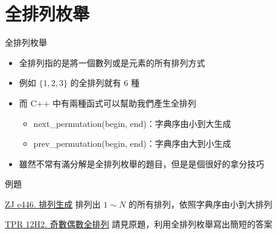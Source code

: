 \documentclass[aspectratio=169]{beamer}
\begin{document}
    \section{全排列枚舉}

    \begin{frame}{全排列枚舉}
        \begin{itemize}
            \item<1-> 全排列指的是將一個數列或是元素的所有排列方式
            \item<1-> 例如 $\{1, 2, 3\}$ 的全排列就有 $6$ 種
            \item<2-> 而 C++ 中有兩種函式可以幫助我們產生全排列
            \begin{itemize}
                \item<2-> next\_permutation(begin, end)：字典序由小到大生成
                \item<2-> prev\_permutation(begin, end)：字典序由大到小生成
            \end{itemize}
            \item<3-> 雖然不常有滿分解是全排列枚舉的題目，但是是個很好的拿分技巧
        \end{itemize}
    \end{frame}

    \begin{frame}{例題}
        \begin{block}{\href{https://zerojudge.tw/ShowProblem?problemid=e446}{ZJ e446. 排列生成}}
            排列出 $1 \sim N$ 的所有排列，依照字典序由小到大排列
        \end{block}

        \begin{block}{\href{https://codeforces.com/group/H0qY3QmnOW/contest/339497/problem/H2}{TPR 12H2. 奇數偶數全排列}}
            請見原題，利用全排列枚舉寫出簡短的答案
        \end{block}
    \end{frame}
\end{document}
